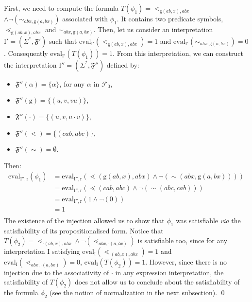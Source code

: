 \documentclass[a4paper]{llncs}
\begin{document}
\begin{example}
  \noindent First, we need to compute the formula $T(\phi_1)=\lessdot_{\mathrm{g}(ab,x),abx}$ $\wedge \neg (\sim_{abx,\mathrm{g}(a,bx)})$ associated with $\phi_1$. It contains two predicate symbols, $\lessdot_{\mathrm{g}(ab,x),abx}$ and $\sim_{abx,\mathrm{g}(a,bx)}$. Then, let us consider an interpretation $\mathrm{I}'=(\Sigma^*,\mathfrak{F}')$ such that $\mathrm{eval}_{\mathrm{I}'}(\lessdot_{\mathrm{g}(ab,x),abx})=1$ and $\mathrm{eval}_{\mathrm{I}'}(\sim_{abx,\mathrm{g}(a,bx)})=0$. Consequently $\mathrm{eval}_{\mathrm{I}'}(T(\phi_1))=1$. From this interpretation, we can construct the interpretation $\mathrm{I}''=(\Sigma^*,\mathfrak{F}'')$ defined by:
    \begin{itemize}
      \item $\mathfrak{F}''(\alpha)=\{\alpha\}$, for any $\alpha$ in $\mathcal{F}_0$, 
      \item $\mathfrak{F}''(\mathrm{g})=\{(u,v,vu)\}$,
      \item $\mathfrak{F}''(\cdot)=\{(u,v,u\cdot v)\}$,      
      \item $\mathfrak{F}''(\lessdot)=\{(cab,abc)\}$,
      \item $\mathfrak{F}''(\sim)=\emptyset$.
    \end{itemize} 
    Then:
        \begin{align*}
        \mathrm{eval}_{\mathrm{I}'',\mathrm{r}}(\phi_1) & =\mathrm{eval}_{\mathrm{I}'',\mathrm{r}}(\lessdot(\mathrm{g}(ab,x),abx)\wedge \neg (\sim(abx,\mathrm{g}(a,bx))))\\
        & =\mathrm{eval}_{\mathrm{I}'',\mathrm{r}}(\lessdot(cab,abc)\wedge \neg (\sim(abc,cab)))\\
        & =\mathrm{eval}_{\mathrm{I}'',\mathrm{r}}(1\wedge \neg (0))\\
        & =1\\
        \end{align*}
        The existence of the injection allowed us to show that $\phi_1$ was satisfiable \emph{via} the satisfiability of its propositionalised form. Notice that $T(\phi_2)=\lessdot_{\cdot(ab,x),abx}\wedge \neg (\lessdot_{abx,\cdot(a,bx)})$ is satisfiable too, since for any interpretation $\mathrm{I}$ satisfying $\mathrm{eval}_{\mathrm{I}}(\lessdot_{\cdot(ab,x),abx})=1$ and $\mathrm{eval}_{\mathrm{I}}(\lessdot_{abx,\cdot(a,bx)})=0$, $\mathrm{eval}_{\mathrm{I}}(T(\phi_2))=1$. However, since there is no injection due to the associativity of $\cdot$ in any expression interpretation, the satisfiability of $T(\phi_2)$ does not allow us to conclude about the satisfiability of the formula $\phi_2$ (see the notion of normalization in the next subsection).  
  \qed
  \end{example}
  
\end{document}

